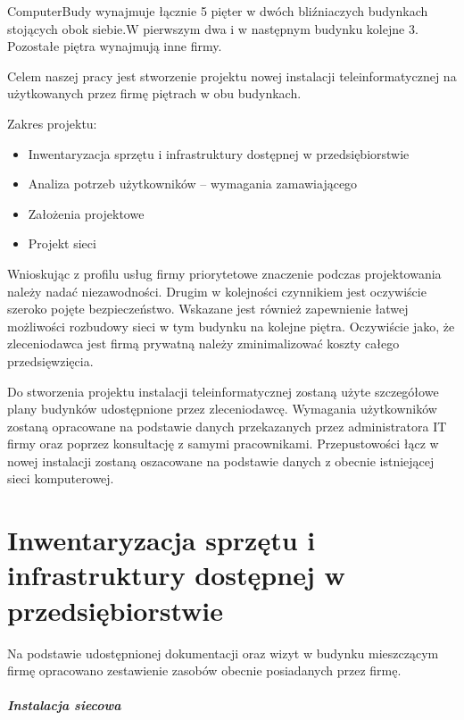 \documentclass{report}
\begin{document}
ComputerBudy wynajmuje łącznie 5 pięter w dwóch bliźniaczych budynkach stojących obok siebie.W pierwszym dwa i w następnym budynku kolejne 3.
Pozostałe piętra wynajmują inne firmy.

Celem naszej pracy jest stworzenie projektu nowej instalacji teleinformatycznej na użytkowanych przez firmę piętrach w obu budynkach.
\pagebreak[4]

 Zakres projektu:
\begin{itemize}
\item{Inwentaryzacja sprzętu i infrastruktury dostępnej w przedsiębiorstwie}
\item{Analiza potrzeb użytkowników – wymagania zamawiającego}
\item{Założenia projektowe}
\item{Projekt sieci}
 
\end{itemize}
Wnioskując z profilu usług firmy priorytetowe znaczenie podczas projektowania należy nadać niezawodności. Drugim w kolejności czynnikiem jest oczywiście
szeroko pojęte bezpieczeństwo. Wskazane jest również zapewnienie łatwej możliwości rozbudowy sieci w tym budynku na kolejne piętra.
Oczywiście jako, że zleceniodawca jest firmą prywatną należy zminimalizować koszty całego przedsięwzięcia.

Do stworzenia projektu instalacji teleinformatycznej zostaną użyte szczegółowe plany budynków udostępnione przez zleceniodawcę.
Wymagania użytkowników zostaną opracowane na podstawie danych przekazanych przez administratora IT firmy oraz poprzez konsultację
z samymi pracownikami. Przepustowości łącz w nowej instalacji zostaną oszacowane na podstawie danych z obecnie istniejącej sieci komputerowej.

\chapter{Inwentaryzacja sprzętu i infrastruktury dostępnej w przedsiębiorstwie}
Na podstawie udostępnionej dokumentacji oraz wizyt w budynku mieszczącym firmę opracowano zestawienie zasobów obecnie posiadanych przez firmę.

\paragraph{Instalacja siecowa}
\end{document}
